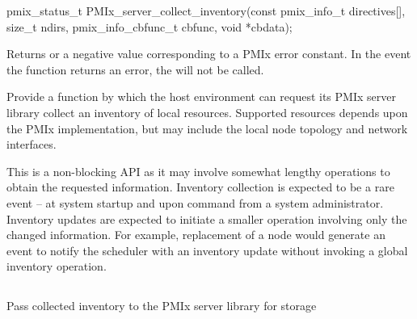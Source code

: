\format

\cspecificstart
\begin{codepar}
pmix_status_t
PMIx_server_collect_inventory(const pmix_info_t directives[],
                              size_t ndirs,
                              pmix_info_cbfunc_t cbfunc,
                              void *cbdata);
\end{codepar}
\cspecificend

\begin{arglist}
\end{arglist}

Returns  or a negative value corresponding to a PMIx error constant. In the event the function returns an error, the  will not be called.

\descr

Provide a function by which the host environment can request its \ac{PMIx} server library collect an inventory of local resources. Supported resources depends upon the \ac{PMIx} implementation, but may include the local node topology and network interfaces.

\advicermstart
This is a non-blocking \ac{API} as it may involve somewhat lengthy operations to obtain the requested information. Inventory collection is expected to be a rare event – at system startup and upon command from a system administrator. Inventory updates are expected to initiate a smaller operation involving only the changed information. For example, replacement of a node would generate an event to notify the scheduler with an inventory update without invoking a global inventory operation.
\advicermend

\subsection{}

\summary

Pass collected inventory to the \ac{PMIx} server library for storage

\format

